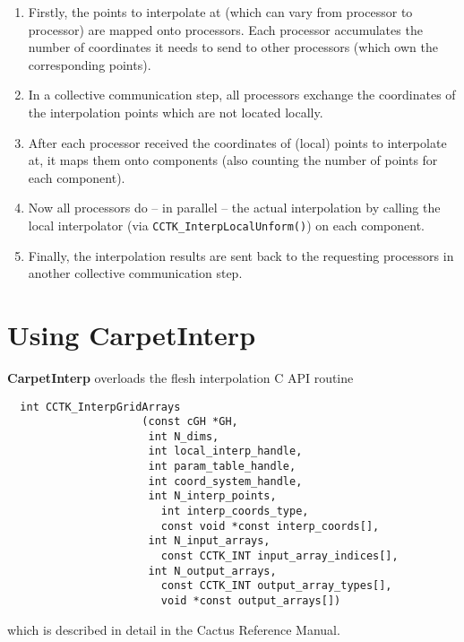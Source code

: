 \begin{enumerate}
  \item Firstly, the points to interpolate at (which can vary from processor
        to processor) are mapped onto processors.
        Each processor accumulates the number of coordinates it needs to
        send to other processors (which own the corresponding points).

  \item In a collective communication step, all processors exchange the
        coordinates of the interpolation points which are not located locally.

  \item After each processor received the coordinates of (local) points to
        interpolate at, it maps them onto components (also counting the
        number of points for each component).

  \item Now all processors do -- in parallel -- the actual interpolation
        by calling the local interpolator (via {\tt CCTK\_InterpLocalUnform()})
        on each component.

  \item Finally, the interpolation results are sent back to the requesting
        processors in another collective communication step.
\end{enumerate}


\section{Using CarpetInterp}

{\bf CarpetInterp} overloads the flesh interpolation C API routine
\begin{verbatim}
  int CCTK_InterpGridArrays
                     (const cGH *GH,
                      int N_dims,
                      int local_interp_handle,
                      int param_table_handle,
                      int coord_system_handle,
                      int N_interp_points,
                        int interp_coords_type,
                        const void *const interp_coords[],
                      int N_input_arrays,
                        const CCTK_INT input_array_indices[],
                      int N_output_arrays,
                        const CCTK_INT output_array_types[],
                        void *const output_arrays[])
\end{verbatim}
which is described in detail in the Cactus Reference Manual.

